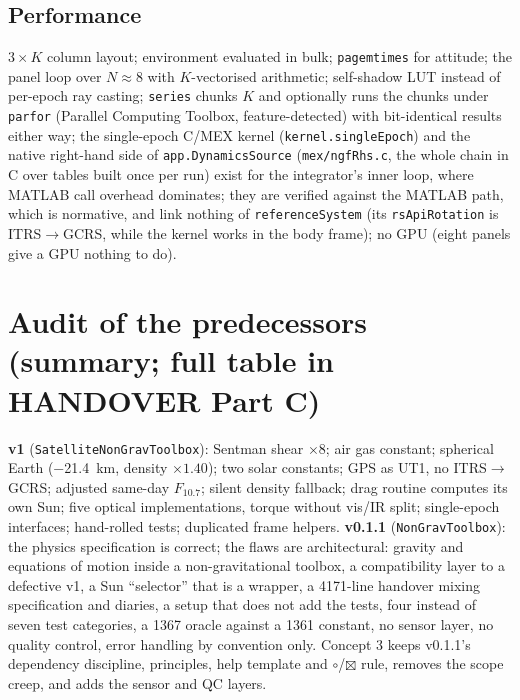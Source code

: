 \subsection{Performance}
$3\times K$ column layout; environment evaluated in bulk; \texttt{pagemtimes} for attitude; the panel loop over $N\approx8$ with $K$-vectorised arithmetic; self-shadow LUT instead of per-epoch ray casting; \texttt{series} chunks $K$ and optionally runs the chunks under \texttt{parfor} (Parallel Computing Toolbox, feature-detected) with bit-identical results either way; the single-epoch C/MEX kernel (\texttt{kernel.singleEpoch}) and the native right-hand side of \texttt{app.DynamicsSource} (\texttt{mex/ngfRhs.c}, the whole chain in C over tables built once per run) exist for the integrator's inner loop, where MATLAB call overhead dominates; they are verified against the MATLAB path, which is normative, and link nothing of \texttt{referenceSystem} (its \texttt{rsApiRotation} is ITRS$\to$GCRS, while the kernel works in the body frame); no GPU (eight panels give a GPU nothing to do).

\section{Audit of the predecessors (summary; full table in HANDOVER Part C)}
\textbf{v1} (\texttt{SatelliteNonGravToolbox}): Sentman shear $\times8$; air gas constant; spherical Earth (\SI{-21.4}{\kilo\metre}, density $\times1.40$); two solar constants; GPS as UT1, no ITRS$\to$GCRS; adjusted same-day $F_{10.7}$; silent density fallback; drag routine computes its own Sun; five optical implementations, torque without vis/IR split; single-epoch interfaces; hand-rolled tests; duplicated frame helpers. \textbf{v0.1.1} (\texttt{NonGravToolbox}): the physics specification is correct; the flaws are architectural: gravity and equations of motion inside a non-gravitational toolbox, a compatibility layer to a defective v1, a Sun ``selector'' that is a wrapper, a 4171-line handover mixing specification and diaries, a setup that does not add the tests, four instead of seven test categories, a 1367 oracle against a 1361 constant, no sensor layer, no quality control, error handling by convention only. Concept 3 keeps v0.1.1's dependency discipline, principles, help template and $\circ$/$\boxtimes$ rule, removes the scope creep, and adds the sensor and QC layers.

